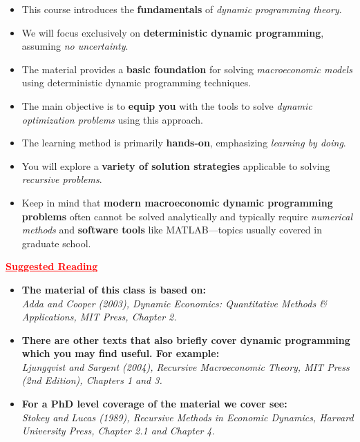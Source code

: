 \documentclass[12pt]{article}
\begin{document}
\begin{itemize}
    \item This course introduces the \textbf{fundamentals} of \textit{dynamic programming theory}.
    \item We will focus exclusively on \textbf{deterministic dynamic programming}, assuming \textit{no uncertainty}.
    \item The material provides a \textbf{basic foundation} for solving \textit{macroeconomic models} using deterministic dynamic programming techniques.
    \item The main objective is to \textbf{equip you} with the tools to solve \textit{dynamic optimization problems} using this approach.
    \item The learning method is primarily \textbf{hands-on}, emphasizing \textit{learning by doing}.
    \item You will explore a \textbf{variety of solution strategies} applicable to solving \textit{recursive problems}.
    \item Keep in mind that \textbf{modern macroeconomic dynamic programming problems} often cannot be solved analytically and typically require \textit{numerical methods} and \textbf{software tools} like MATLAB—topics usually covered in graduate school.
\end{itemize}

\begin{center}
    \textcolor{red}{\textbf{\uline{Suggested Reading}}}
\end{center}

\begin{itemize}
    \item \textbf{The material of this class is based on:} \\
    \textit{Adda and Cooper (2003), Dynamic Economics: Quantitative Methods \& Applications, MIT Press, Chapter 2.}

    \item \textbf{There are other texts that also briefly cover dynamic programming which you may find useful. For example:} \\
    \textit{Ljungqvist and Sargent (2004), Recursive Macroeconomic Theory, MIT Press (2nd Edition), Chapters 1 and 3.}

    \item \textbf{For a PhD level coverage of the material we cover see:} \\
    \textit{Stokey and Lucas (1989), Recursive Methods in Economic Dynamics, Harvard University Press, Chapter 2.1 and Chapter 4.}
\end{itemize}
\end{document}
